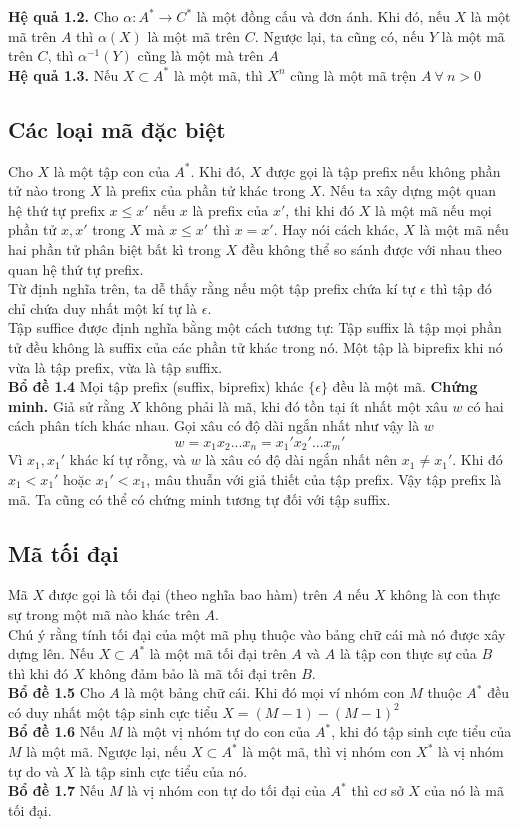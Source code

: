 \documentclass[14pt]{extreport}
\begin{document}
\textbf{Hệ quả 1.2.} Cho $\alpha : A^* \rightarrow C^*$ là một đồng cấu và đơn ánh. Khi đó, nếu $X$ là một mã trên $A$ thì $\alpha (X)$ là một mã trên $C$. Ngược lại, ta cũng có, nếu $Y$ là một mã trên $C$, thì $\alpha^{-1}(Y)$ cũng là một mà trên $A$ \\

\textbf{Hệ quả 1.3.} Nếu $X \subset A^*$ là một mã, thì $X^n$ cũng là một mã trện $A \ \forall \ n > 0$
\subsection{Các loại mã đặc biệt}
Cho $X$ là một tập con của $A^*$. Khi đó, $X$ được gọi là tập prefix nếu không phần tử nào trong $X$ là prefix của phần tử khác trong $X$. Nếu ta xây dựng một quan hệ thứ tự prefix $x \leq x'$ nếu $x$ là prefix của $x'$, thi khi đó $X$ là một mã nếu mọi phần tử $ x, x'$ trong $X$ mà $x \leq x'$ thì $x = x'$. Hay nói cách khác, $X$ là một mã nếu hai phần tử phân biệt bất kì trong $X$ đều không thể so sánh được với nhau theo quan hệ thứ tự prefix. \\
Từ định nghĩa trên, ta dễ thấy rằng nếu một tập prefix chứa kí tự $\epsilon $ thì tập đó chỉ chứa duy nhất một kí tự là $\epsilon$.\\
Tập suffice được định nghĩa bằng một cách tương tự: Tập suffix là tập mọi phần tử đều không là suffix của các phần tử khác trong nó. Một tập là biprefix khi nó vừa là tập prefix, vừa là tập suffix. \\
\textbf{Bổ đề 1.4} Mọi tập prefix (suffix, biprefix) khác $\{ \epsilon \} $ đều là một mã.
\textbf{Chứng minh.} Giả sử rằng $X$ không phải là mã, khi đó tồn tại ít nhất một xâu $w$ có hai cách phân tích khác nhau. Gọi xâu có độ dài ngắn nhất như vậy là $w$
$$w = x_1x_2...x_n = x_1'x_2'...x_m'$$
Vì $x_1, x_1'$ khác kí tự rỗng, và $w$ là xâu có độ dài ngắn nhất nên $x_1 \neq x_1'$. Khi đó $x_1 < x_1'$ hoặc $x_1' < x_1$, mâu thuẫn với giả thiết của tập prefix. Vậy tập prefix là mã. Ta cũng có thể có chứng minh tương tự đối với tập suffix.

\subsection{Mã tối đại}
Mã $X$ được gọi là tối đại (theo nghĩa bao hàm) trên $A$ nếu $X$ không là con thực sự trong một mã nào khác trên $A$.\\
Chú ý rằng tính tối đại của một mã phụ thuộc vào bảng chữ cái mà nó được xây dựng lên. Nếu $X \subset A^*$ là một mã tối đại trên $A$ và $A$ là tập con thực sự của $B$ thì khi đó $X$ không đảm bảo là mã tối đại trên $B$.\\
\textbf{Bổ đề 1.5} Cho $A$ là một bảng chữ cái. Khi đó mọi ví nhóm con $M$ thuộc $A^*$ đều có duy nhất một tập sinh cực tiểu $X = (M-1) - (M-1)^2$\\
\textbf{Bổ đề 1.6} Nếu $M$ là một vị nhóm tự do con của $A^*$, khi đó tập sinh cực tiểu của $M$ là một mã. Ngược lại, nếu $X \subset A^*$ là một mã, thì vị nhóm con $X^*$ là vị nhóm tự do và $X$ là tập sinh cực tiểu của nó.\\
\textbf{Bổ đề 1.7} Nếu $M$ là vị nhóm con tự do tối đại của $A^*$ thì cơ sở $X$ của nó là mã tối đại.
\end{document}

